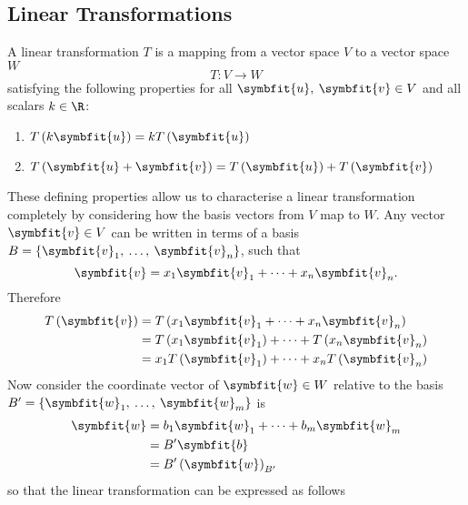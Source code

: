 \documentclass{article}
\begin{document}
\begin{multicols*}{3}
    \subsection{Linear Transformations}
    A linear transformation \(T\) is a mapping from a vector space \(V\) to a vector space \(W\)
    \begin{equation*}
        T:V \to W
    \end{equation*}
    satisfying the following properties for all \(\symbfit{u},\: \symbfit{v} \in V\) and all
    scalars \(k \in \R\):
    \begin{enumerate}
        \item \(T\left( k\symbfit{u} \right) = k T\left( \symbfit{u} \right)\)
        \item \(T\left( \symbfit{u} + \symbfit{v} \right) = T\left( \symbfit{u} \right) + T\left( \symbfit{v} \right)\)
    \end{enumerate}
    These defining properties allow us to characterise a linear transformation completely
    by considering how the basis vectors from \(V\) map to \(W\). Any vector \(\symbfit{v} \in V\)
    can be written in terms of a basis \(B = \left\{ \symbfit{v}_1,\: \dots,\: \symbfit{v}_n \right\}\), such that
    \begin{equation*}
        \symbfit{v} = x_1 \symbfit{v}_1 + \cdots + x_n \symbfit{v}_n.
    \end{equation*}
    Therefore
    \begin{align*}
        T\left( \symbfit{v} \right) & = T\left( x_1 \symbfit{v}_1 + \cdots + x_n \symbfit{v}_n \right)                 \\
                                    & = T\left( x_1 \symbfit{v}_1 \right) + \cdots + T\left( x_n \symbfit{v}_n \right) \\
                                    & = x_1 T\left( \symbfit{v}_1 \right) + \cdots + x_n T\left( \symbfit{v}_n \right)
    \end{align*}
    Now consider the coordinate vector of \(\symbfit{w} \in W\) relative to the basis \(B' = \left\{ \symbfit{w}_1,\: \dots,\: \symbfit{w}_m \right\}\) is
    \begin{align*}
        \symbfit{w} & = b_1 \symbfit{w}_1 + \cdots + b_m \symbfit{w}_m \\
                    & = B' \symbfit{b}                                 \\
                    & = B' \left( \symbfit{w} \right)_{B'}
    \end{align*}
    so that the linear transformation can be expressed as follows

\end{multicols*}
\end{document}
